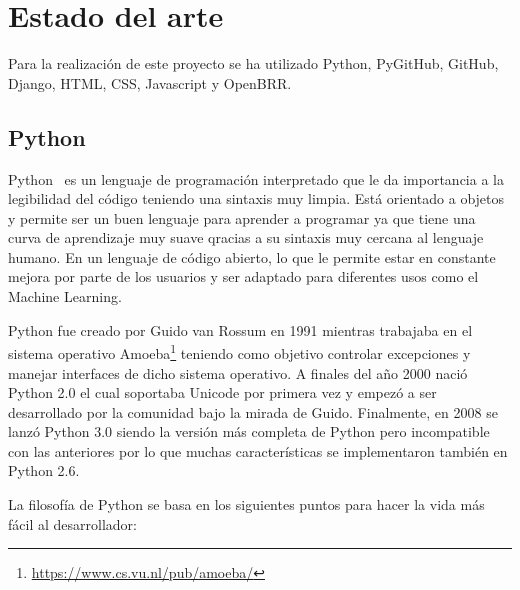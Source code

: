 \documentclass[a4paper, 12pt]{book}
\begin{document}

\cleardoublepage
\chapter{Estado del arte}
\label{chap:estado}

Para la realización de este proyecto se ha utilizado Python, PyGitHub, GitHub, Django, HTML, CSS, Javascript y OpenBRR.

\section{Python}
\label{sec:python}

Python~\cite{website:Python} es un lenguaje de programación interpretado que le da importancia a la legibilidad del código teniendo una sintaxis muy limpia. Está orientado a objetos y permite ser un buen lenguaje para aprender a programar ya que tiene una curva de aprendizaje muy suave qracias a su sintaxis muy cercana al lenguaje humano. En un lenguaje de código abierto, lo que le permite estar en constante mejora por parte de los usuarios y ser adaptado para diferentes usos como el Machine Learning.

Python fue creado por Guido van Rossum en 1991 mientras trabajaba en el sistema operativo Amoeba\footnote{\url{https://www.cs.vu.nl/pub/amoeba/}} teniendo como objetivo controlar excepciones y manejar interfaces de dicho sistema operativo. A finales del año 2000 nació Python 2.0 el cual soportaba Unicode por primera vez y empezó a ser desarrollado por la comunidad bajo la mirada de Guido. Finalmente, en 2008 se lanzó Python 3.0 siendo la versión más completa de Python pero incompatible con las anteriores por lo que muchas características se implementaron también en Python 2.6.

La filosofía de Python se basa en los siguientes puntos para hacer la vida más fácil al desarrollador:
\end{document}
